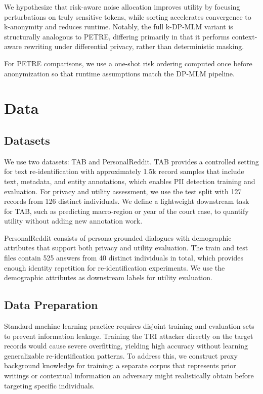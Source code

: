 \documentclass[10pt, a4paper]{article}
\begin{document}
We hypothesize that risk-aware noise allocation improves utility by focusing perturbations on truly sensitive tokens, while sorting accelerates convergence to k-anonymity and reduces runtime. Notably, the full k-DP-MLM variant is structurally analogous to PETRE, differing primarily in that it performs context-aware rewriting under differential privacy, rather than deterministic masking.

For PETRE comparisons, we use a one-shot risk ordering computed once before anonymization so that runtime assumptions match the DP-MLM pipeline.

\section{Data}

\subsection{Datasets}

We use two datasets: TAB and PersonalReddit. TAB \cite{pilan_text_2022} provides a controlled setting for text re-identification with approximately 1.5k record samples that include text, metadata, and entity annotations, which enables PII detection training and evaluation. For privacy and utility assessment, we use the test split with 127 records from 126 distinct individuals. We define a lightweight downstream task for TAB, such as predicting macro-region or year of the court case, to quantify utility without adding new annotation work.

PersonalReddit \cite{staab_beyond_2024} consists of persona-grounded dialogues with demographic attributes that support both privacy and utility evaluation. The train and test files contain 525 answers from 40 distinct individuals in total, which provides enough identity repetition for re-identification experiments. We use the demographic attributes as downstream labels for utility evaluation.

\subsection{Data Preparation}

Standard machine learning practice requires disjoint training and evaluation sets to prevent information leakage. Training the TRI attacker directly on the target records would cause severe overfitting, yielding high accuracy without learning generalizable re-identification patterns. To address this, we construct proxy background knowledge for training: a separate corpus that represents prior writings or contextual information an adversary might realistically obtain before targeting specific individuals.
\end{document}
